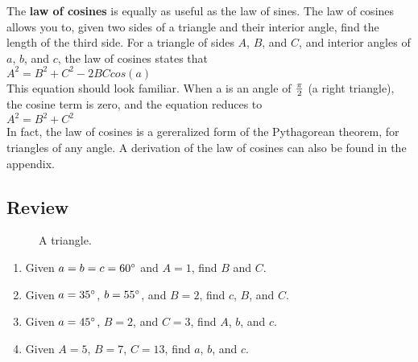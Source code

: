 The {\bf law of cosines} is equally as useful as the law of sines.  The law  of cosines allows you to, given two sides of a triangle and their interior angle, find the length of the third side.  For a triangle of sides $A$, $B$, and $C$, and interior angles of $a$, $b$, and $c$, the law of cosines states that\\

\tab$A^2 = B^2 + C^2 - 2BCcos(a)$\\

This equation should look familiar.  When a is an angle of $\frac{\pi}{2}$ (a right triangle), the cosine term is zero, and the equation reduces to \\

\tab$A^2 = B^2 + C^2$\\

In fact, the law of cosines is a gereralized form of the Pythagorean theorem, for triangles of any angle.  A derivation of the law of cosines can also be found in the appendix.\\

\subsection{Review}

{\begin{figure}[htb]
\center
\caption{A triangle.}
\label{fig:A triangle}
\end{figure}
}

\begin{enumerate}

\item{Given $a=b=c=60^\circ$ and $A=1$, find $B$ and $C$.}\\

\item{Given $a=35^\circ$, $b=55^\circ$, and $B=2$, find $c$, $B$, and $C$.}\\

\item{Given $a=45^\circ$, $B=2$, and $C=3$, find $A$, $b$, and $c$.}\\

\item{Given $A=5$, $B=7$, $C=13$, find $a$, $b$, and $c$.}\\

\end{enumerate}



